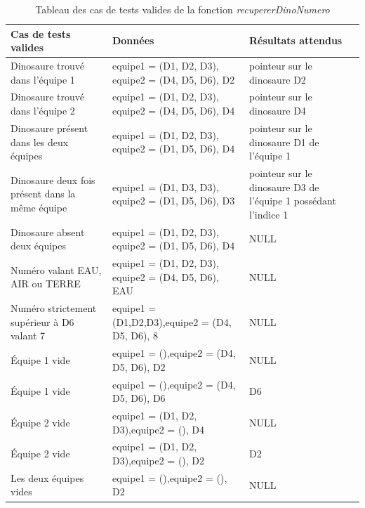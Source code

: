 \documentclass[11pt,a4paper]{article}
\begin{document}
\begin{table}[H]
    \centering
    \small
    \begin{tabularx}{\textwidth}{|
    >{\centering\arraybackslash}p{3.2cm}|
    >{\arraybackslash}X|
    >{\centering\arraybackslash}p{4cm}|} \hline
        \textbf{Cas de tests valides} & \centering\textbf{Données} & \textbf{Résultats attendus} \\ \hline
        Dinosaure trouvé dans l’équipe 1 & equipe1 = (D1, D2, D3), equipe2 = (D4, D5, D6), D2 & pointeur sur le dinosaure D2 \\ \hline
        Dinosaure trouvé dans l’équipe 2 & equipe1 = (D1, D2, D3), equipe2 = (D4, D5, D6), D4 & pointeur sur le dinosaure D4 \\ \hline
        Dinosaure présent dans les deux équipes & equipe1 = (D1, D2, D3), equipe2 = (D1, D5, D6), D4 & pointeur sur le dinosaure D1 de l'équipe 1 \\ \hline
        Dinosaure deux fois présent dans la même équipe & equipe1 = (D1, D3, D3), equipe2 = (D1, D5, D6), D3 & pointeur sur le dinosaure D3 de l'équipe 1 possédant l'indice 1 \\ \hline
        Dinosaure absent deux équipes & equipe1 = (D1, D2, D3), equipe2 = (D1, D5, D6), D4 & NULL \\ \hline
        Numéro valant EAU, AIR ou TERRE & equipe1 = (D1, D2, D3), equipe2 = (D4, D5, D6), EAU & NULL \\ \hline
        Numéro strictement supérieur à D6 valant 7 & equipe1 = (D1,D2,D3),\newline equipe2 = (D4, D5, D6), 8 & NULL \\ \hline
        Équipe 1 vide & equipe1 = (),\newline equipe2 = (D4, D5, D6), D2 & NULL \\ \hline
        Équipe 1 vide & equipe1 = (),\newline equipe2 = (D4, D5, D6), D6 & D6 \\ \hline
        Équipe 2 vide & equipe1 = (D1, D2, D3),\newline equipe2 = (),  D4 & NULL \\ \hline
        Équipe 2 vide & equipe1 = (D1, D2, D3),\newline equipe2 = (), D2 & D2 \\ \hline
        Les deux équipes vides & equipe1 = (),\newline equipe2 = (), D2 & NULL \\ \hline
    \end{tabularx}
    \caption{Tableau des cas de tests valides de la fonction \textit{\mbox{recupererDinoNumero}}}
    \label{tab_cas_valides_ recupererDinoNumero}
\end{table}
\end{document}
